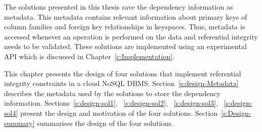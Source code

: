 The solutions presented in this thesis save the dependency information as
metadata.    This metadata contains relevant  information about primary keys of
column families and foreign key relationships in keyspaces.   Thus,  metadata is
accessed whenever an operation is performed on the data and referential
integrity needs to be validated.  These solutions are implemented using an
experimental \ac{API} which is discussed in Chapter~\ref{c:Implementation}. 


This chapter presents the design of  four  solutions  that implement referential
integrity constraints in a cloud \ac{NoSQL} \ac{DBMS}.   
Section~\ref{s:design-Metadata} describes the metadata used by the solutions 
 to store the dependency information.    Sections~\ref{s:design-sol1}, 
 ~\ref{s:design-sol2}, ~\ref{s:design-sol3}, ~\ref{s:design-sol4}  present
 the design and motivation of the four solutions. 
Section~\ref{s:Design-summary}
 summarises the design of the four solutions.   













